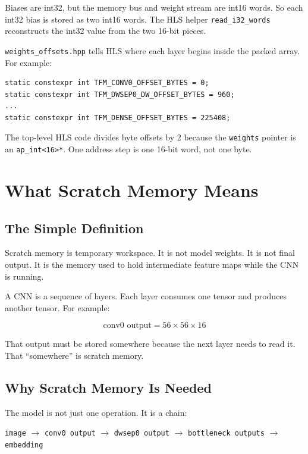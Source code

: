 \documentclass[11pt]{article}
\newcommand{\code}[1]{\texttt{#1}}
\begin{document}
Biases are int32, but the memory bus and weight stream are int16 words.
So each int32 bias is stored as two int16 words.
The HLS helper \code{read\_i32\_words} reconstructs the int32 value from the two 16-bit pieces.

\code{weights\_offsets.hpp} tells HLS where each layer begins inside the packed array.
For example:

\begin{lstlisting}
static constexpr int TFM_CONV0_OFFSET_BYTES = 0;
static constexpr int TFM_DWSEP0_DW_OFFSET_BYTES = 960;
...
static constexpr int TFM_DENSE_OFFSET_BYTES = 225408;
\end{lstlisting}

The top-level HLS code divides byte offsets by 2 because the \code{weights} pointer is an \code{ap\_int<16>*}.
One address step is one 16-bit word, not one byte.

\section{What Scratch Memory Means}

\subsection{The Simple Definition}

Scratch memory is temporary workspace.
It is not model weights.
It is not final output.
It is the memory used to hold intermediate feature maps while the CNN is running.

A CNN is a sequence of layers.
Each layer consumes one tensor and produces another tensor.
For example:

\[
  \text{conv0 output} = 56 \times 56 \times 16
\]

That output must be stored somewhere because the next layer needs to read it.
That ``somewhere'' is scratch memory.

\subsection{Why Scratch Memory Is Needed}

The model is not just one operation.
It is a chain:

\begin{center}
\code{image} \(\rightarrow\)
\code{conv0 output} \(\rightarrow\)
\code{dwsep0 output} \(\rightarrow\)
\code{bottleneck outputs} \(\rightarrow\)
\code{embedding}
\end{center}
\end{document}
